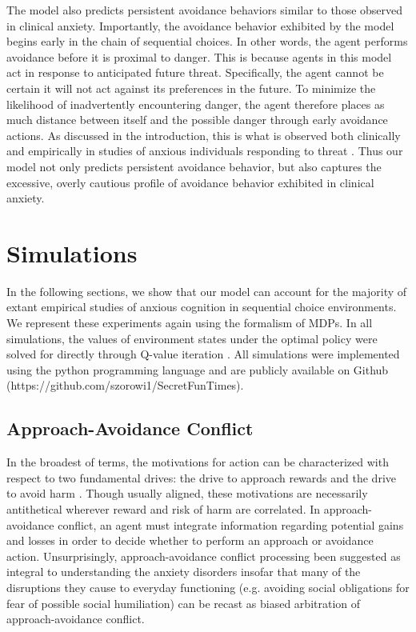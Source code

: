 \documentclass[11pt]{article} %
\begin{document}
The model also predicts persistent avoidance behaviors similar to those observed in clinical anxiety. Importantly, the avoidance behavior exhibited by the model begins early in the chain of sequential choices. In other words, the agent performs avoidance before it is proximal to danger. This is because agents in this model act in response to anticipated future threat. Specifically, the agent cannot be certain it will not act against its preferences in the future. To minimize the likelihood of inadvertently encountering danger, the agent therefore places as much distance between itself and the possible danger through early avoidance actions. As discussed in the introduction, this is what is observed both clinically and empirically in studies of anxious individuals responding to threat \citep{Bach2014, Bach2017, Sheynin2014}. Thus our model not only predicts persistent avoidance behavior, but also captures the excessive, overly cautious profile of avoidance behavior exhibited in clinical anxiety.

\section{Simulations}

In the following sections, we show that our model can account for the majority of extant empirical studies of anxious cognition in sequential choice environments. We represent these experiments again using the formalism of MDPs. In all simulations, the values of environment states under the optimal policy were solved for directly through Q-value iteration \citep{bertsekas2005, SuttonBarto2018}. All simulations were implemented using the python programming language and are publicly available on Github (https://github.com/szorowi1/SecretFunTimes).

\subsection{Approach-Avoidance Conflict}

In the broadest of terms, the motivations for action can be characterized with respect to two fundamental drives: the drive to approach rewards and the drive to avoid harm \citep{corr2013}. Though usually aligned, these motivations are necessarily antithetical wherever reward and risk of harm are correlated. In approach-avoidance conflict, an agent must integrate information regarding potential gains and losses in order to decide whether to perform an approach or avoidance action. Unsurprisingly, approach-avoidance conflict processing been suggested as integral to understanding the anxiety disorders \citep{aupperle2010} insofar that many of the disruptions they cause to everyday functioning (e.g. avoiding social obligations for fear of possible social humiliation) can be recast as biased arbitration of approach-avoidance conflict.
\end{document}
